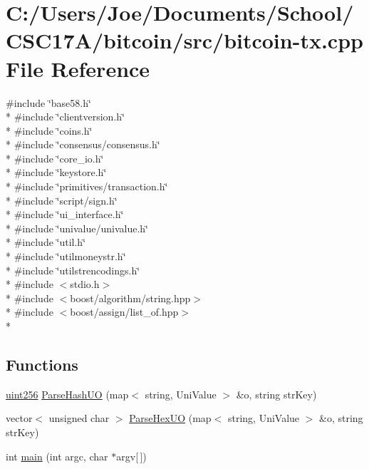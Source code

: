 \hypertarget{bitcoin-tx_8cpp}{}\section{C\+:/\+Users/\+Joe/\+Documents/\+School/\+C\+S\+C17\+A/bitcoin/src/bitcoin-\/tx.cpp File Reference}
\label{bitcoin-tx_8cpp}
{\ttfamily \#include \char`\"{}base58.\+h\char`\"{}}\\*
{\ttfamily \#include \char`\"{}clientversion.\+h\char`\"{}}\\*
{\ttfamily \#include \char`\"{}coins.\+h\char`\"{}}\\*
{\ttfamily \#include \char`\"{}consensus/consensus.\+h\char`\"{}}\\*
{\ttfamily \#include \char`\"{}core\+\_\+io.\+h\char`\"{}}\\*
{\ttfamily \#include \char`\"{}keystore.\+h\char`\"{}}\\*
{\ttfamily \#include \char`\"{}primitives/transaction.\+h\char`\"{}}\\*
{\ttfamily \#include \char`\"{}script/sign.\+h\char`\"{}}\\*
{\ttfamily \#include \char`\"{}ui\+\_\+interface.\+h\char`\"{}}\\*
{\ttfamily \#include \char`\"{}univalue/univalue.\+h\char`\"{}}\\*
{\ttfamily \#include \char`\"{}util.\+h\char`\"{}}\\*
{\ttfamily \#include \char`\"{}utilmoneystr.\+h\char`\"{}}\\*
{\ttfamily \#include \char`\"{}utilstrencodings.\+h\char`\"{}}\\*
{\ttfamily \#include $<$stdio.\+h$>$}\\*
{\ttfamily \#include $<$boost/algorithm/string.\+hpp$>$}\\*
{\ttfamily \#include $<$boost/assign/list\+\_\+of.\+hpp$>$}\\*
\subsection*{Functions}
\begin{DoxyCompactItemize}
\item 
\hyperlink{classuint256}{uint256} \hyperlink{bitcoin-tx_8cpp_a7f5c8e5ec156f294d9334330e81611b9}{Parse\+Hash\+U\+O} (map$<$ string, Uni\+Value $>$ \&o, string str\+Key)
\item 
vector$<$ unsigned char $>$ \hyperlink{bitcoin-tx_8cpp_a305c1a70a88f39850f0ac9df9f45497b}{Parse\+Hex\+U\+O} (map$<$ string, Uni\+Value $>$ \&o, string str\+Key)
\item 
int \hyperlink{bitcoin-tx_8cpp_a0ddf1224851353fc92bfbff6f499fa97}{main} (int argc, char $\ast$argv\mbox{[}$\,$\mbox{]})
\end{DoxyCompactItemize}
